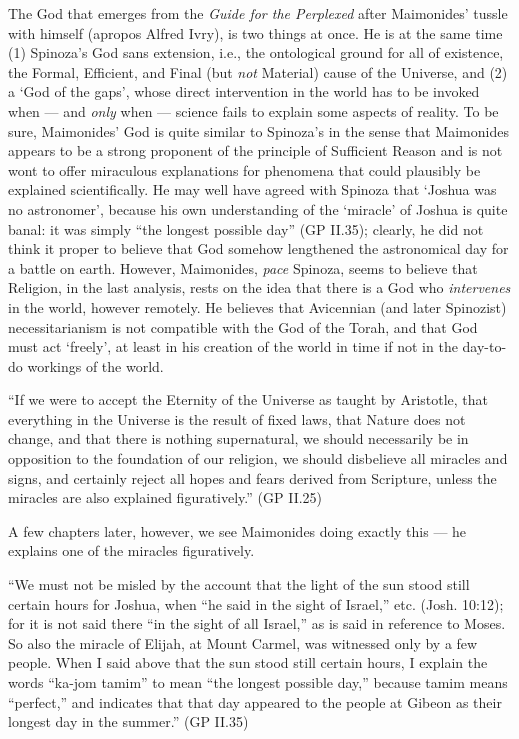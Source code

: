 \documentclass[12pt]{article}
\begin{document}
The God that emerges from the \emph{Guide for the Perplexed} after Maimonides' tussle with himself  (apropos Alfred Ivry), is two things at once. He is at the same time (1) Spinoza's God sans extension, i.e., the ontological ground for all of existence, the Formal, Efficient, and Final (but \emph{not} Material) cause of the Universe, and (2) a `God of the gaps', whose direct intervention in the world has to be invoked when --- and \emph{only} when --- science fails to explain some aspects of reality. To be sure, Maimonides' God is quite similar to Spinoza's in the sense that Maimonides appears to be a strong proponent of the principle of Sufficient Reason and is not wont to offer miraculous explanations for phenomena that could plausibly be explained scientifically. He may well have agreed with Spinoza that `Joshua was no astronomer', because his own understanding of the `miracle' of Joshua is quite banal: it was simply ``the longest possible day'' (GP II.35); clearly, he did not think it proper to believe that God somehow lengthened the astronomical day for a battle on earth. However, Maimonides, \emph{pace} Spinoza, seems to believe that Religion, in the last analysis, rests on the idea that there is a God who \emph{intervenes} in the world, however remotely. He believes that Avicennian (and later Spinozist) necessitarianism is not compatible with the God of the Torah, and that God must act `freely', at least in his creation of the world in time if not in the day-to-do workings of the world.

\begin{displayquote}
``If we were to accept the Eternity of the Universe as taught by Aristotle, that everything in the Universe is the result of fixed laws, that Nature does not change, and that there is nothing supernatural, we should necessarily be in opposition to the foundation of our religion, we should disbelieve all miracles and signs, and certainly reject all hopes and fears derived from Scripture, unless the miracles are also explained figuratively.'' \hfill (GP II.25)
\end{displayquote}

A few chapters later, however, we see Maimonides doing exactly this --- he explains one of the miracles figuratively.
\begin{displayquote}
``We must not be misled by the account that the light of the sun stood still certain hours for Joshua, when “he said in the sight of Israel,” etc. (Josh. 10:12); for it is not said there “in the sight of all Israel,” as is said in reference to Moses. So also the miracle of Elijah, at Mount Carmel, was witnessed only by a few people. When I said above that the sun stood still certain hours, I explain the words “ka-jom tamim” to mean “the longest possible day,” because tamim means “perfect,” and indicates that that day appeared to the people at Gibeon as their longest day in the summer.'' \hfill (GP II.35)
\end{displayquote}
\end{document}
